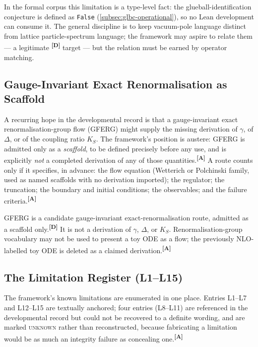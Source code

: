 \documentclass[12pt,a4paper,twoside]{article}
\theoremstyle{plain}
\theoremstyle{definition}
\theoremstyle{remark}
\newcommand{\catmark}[1]{\textsuperscript{\textsf{\textbf{[#1]}}}}
\begin{document}
\noindent In the formal corpus this limitation is a type-level fact: the
glueball-identification conjecture is defined as \texttt{False}
(\cref{subsec:glbc-operational}), so no Lean development can consume it.
The general discipline is to keep vacuum-pole language distinct from
lattice particle-spectrum language; the framework may aspire to relate
them --- a legitimate \catmark{D} target --- but the relation must be
earned by operator matching.

\subsection{Gauge-Invariant Exact Renormalisation as Scaffold}
\label{subsec:gferg-scaffold}

A recurring hope in the developmental record is that a gauge-invariant
exact renormalisation-group flow (GFERG) might supply the missing
derivation of $\gamma$, of $\Delta$, or of the coupling ratio $K_S$. The
framework's position is austere: GFERG is admitted only as a
\emph{scaffold}, to be defined precisely before any use, and is
explicitly \emph{not} a completed derivation of any of those
quantities.\catmark{A} A route counts only if it specifies, in advance:
the flow equation (Wetterich or Polchinski family, used as named
scaffolds with no derivation imported); the regulator; the truncation;
the boundary and initial conditions; the observables; and the failure
criteria.\catmark{A}

\begin{governancebox}
GFERG is a candidate gauge-invariant exact-renormalisation route,
admitted as a scaffold only.\catmark{D} It is not a derivation of
$\gamma$, $\Delta$, or $K_S$. Renormalisation-group vocabulary may not
be used to present a toy ODE as a flow; the previously NLO-labelled toy
ODE is deleted as a claimed derivation.\catmark{A}
\end{governancebox}

\subsection{The Limitation Register (L1--L15)}
\label{subsec:limitation-register}

The framework's known limitations are enumerated in one place. Entries
L1--L7 and L12--L15 are textually anchored; four entries (L8--L11) are
referenced in the developmental record but could not be recovered to a
definite wording, and are marked \textsc{unknown} rather than
reconstructed, because fabricating a limitation would be as much an
integrity failure as concealing one.\catmark{A}
\end{document}
